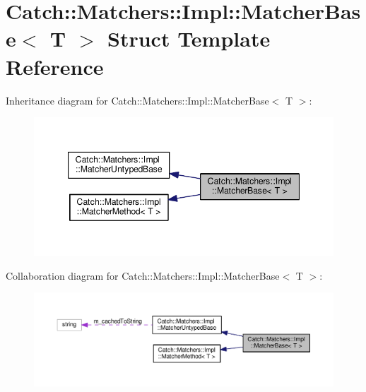 \hypertarget{structCatch_1_1Matchers_1_1Impl_1_1MatcherBase}{}\section{Catch\+:\+:Matchers\+:\+:Impl\+:\+:Matcher\+Base$<$ T $>$ Struct Template Reference}
\label{structCatch_1_1Matchers_1_1Impl_1_1MatcherBase}


Inheritance diagram for Catch\+:\+:Matchers\+:\+:Impl\+:\+:Matcher\+Base$<$ T $>$\+:\nopagebreak
\begin{figure}[H]
\begin{center}
\leavevmode
\includegraphics[width=347pt]{structCatch_1_1Matchers_1_1Impl_1_1MatcherBase__inherit__graph}
\end{center}
\end{figure}


Collaboration diagram for Catch\+:\+:Matchers\+:\+:Impl\+:\+:Matcher\+Base$<$ T $>$\+:\nopagebreak
\begin{figure}[H]
\begin{center}
\leavevmode
\includegraphics[width=350pt]{structCatch_1_1Matchers_1_1Impl_1_1MatcherBase__coll__graph}
\end{center}
\end{figure}
